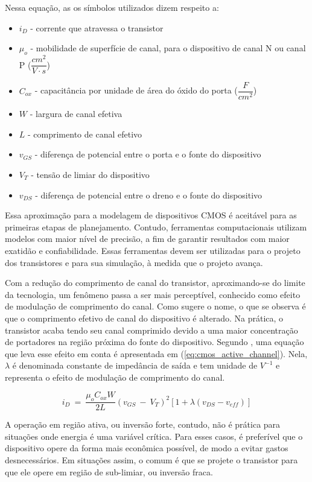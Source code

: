 Nessa equação, as os símbolos utilizados dizem respeito a:
\begin{itemize}
	\item $i_D$ - corrente que atravessa o transistor
	\item $\mu_o$ - mobilidade de superfície de canal, para o dispositivo de canal N ou canal P ($\dfrac{cm^2}{V \cdot s}$)
	\item $C_{ox}$ - capacitância por unidade de área do óxido do porta ($\dfrac{F}{cm^2}$)
	\item $W$ - largura de canal efetiva
	\item $L$ - comprimento de canal efetivo
	\item $v_{GS}$ - diferença de potencial entre o porta e o fonte do dispositivo
	\item $V_T$ - tensão de limiar do dispositivo
	\item $v_{DS}$ - diferença de potencial entre o dreno e o fonte do dispositivo
\end{itemize}

Essa aproximação para a modelagem de dispositivos {CMOS} é aceitável para as primeiras etapas de planejamento. Contudo, ferramentas computacionais utilizam modelos com maior nível de precisão, a fim de garantir resultados com maior exatidão e confiabilidade. Essas ferramentas devem ser utilizadas para o projeto dos transistores e para sua simulação, à medida que o projeto avança.

Com a redução do comprimento de canal do transistor, aproximando-se do limite da tecnologia, um fenômeno passa a ser mais perceptível, conhecido como efeito de modulação de comprimento do canal. Como sugere o nome, o que se observa é que o comprimento efetivo de canal do dispositivo é alterado. Na prática, o transistor acaba tendo seu canal comprimido devido a uma maior concentração de portadores na região próxima do fonte do dispositivo. Segundo , uma equação que leva esse efeito em conta é apresentada em (\ref{eq:cmos_active_channel}). Nela, $\lambda$ é denominada constante de impedância de saída e tem unidade de $V^{-1}$ e representa o efeito de modulação de comprimento do canal.

\begin{equation}
	\label{eq:cmos_active_channel}
	i_D~=~\dfrac{\mu_oC_{ox}W}{2L} (v_{GS}~-~V_T)^2 [ 1 + \lambda( v_{DS} - v_{eff} ) ]
\end{equation}

A operação em região ativa, ou inversão forte, contudo, não é prática para situações onde energia é uma variável crítica. Para esses casos, é preferível que o dispositivo opere da forma mais econômica possível, de modo a evitar gastos desnecessários. Em situações assim, o comum é que se projete o transistor para que ele opere em região de sub-limiar, ou inversão fraca.

